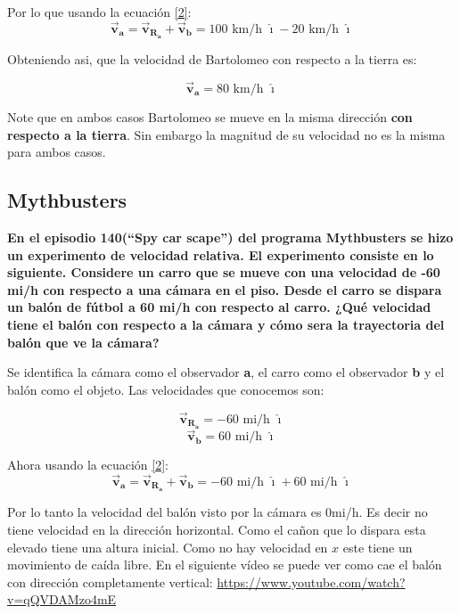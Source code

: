 \documentclass[a4paper,11pt]{article}
\begin{document}
	Por lo que usando la ecuación \ref{2}:
	\begin{equation}
	\vec{\textbf{v}}_{\textbf{a}} = \vec{\textbf{v}}_{\textbf{R}_\textbf{a}} + \vec{\textbf{v}}_{\textbf{b}} = 100 \text{ km/h }\boldsymbol{\hat{\imath}} - 20 \text{ km/h } \boldsymbol{\hat{\imath}}
	\end{equation}
	
	Obteniendo asi, que la velocidad de Bartolomeo con respecto a la tierra es:
	
	\begin{equation}
	\vec{\textbf{v}}_{\textbf{a}}= 80 \text{ km/h } \boldsymbol{\hat{\imath}}
	\end{equation}
	
	
	Note que en ambos casos Bartolomeo se mueve en la misma dirección \textbf{con respecto a la tierra}. Sin embargo la magnitud de su velocidad no es la misma para ambos casos.
		\color{pb}
	\subsection{Mythbusters}
	\textbf{En el episodio 140(``Spy car scape'') del programa Mythbusters se hizo un experimento de velocidad relativa. El experimento consiste en lo siguiente. Considere un carro que se mueve con una velocidad de -60 mi/h con respecto a una cámara en el piso. Desde el carro se dispara un balón de fútbol a 60 mi/h con respecto al carro. ¿Qué velocidad tiene el balón con respecto a la cámara y cómo sera la trayectoria del balón que ve la cámara?
		\\ }	\color{black}
	
	Se identifica la cámara como el observador \textbf{a}, el carro como el observador \textbf{b} y el balón como el objeto. Las velocidades que conocemos son:
	
	
	$$ \vec{\textbf{v}}_{\textbf{R}_\textbf{a}} = -60 \text{ mi/h } \boldsymbol{\hat{\imath}} $$
	$$ \vec{\textbf{v}}_{\textbf{b}} = 60 \text{ mi/h } \boldsymbol{\hat{\imath}}$$ 
	
	Ahora usando la ecuación \ref{2}:
	\begin{equation}
	\vec{\textbf{v}}_{\textbf{a}} = \vec{\textbf{v}}_{\textbf{R}_\textbf{a}} + \vec{\textbf{v}}_{\textbf{b}} = -60 \text{ mi/h }\boldsymbol{\hat{\imath}} + 60 \text{ mi/h } \boldsymbol{\hat{\imath}}
	\end{equation}
	
	Por lo tanto la velocidad del balón visto por la cámara es $0 $mi/h. Es decir no tiene velocidad en la dirección horizontal. Como el cañon que lo dispara esta elevado tiene una altura inicial. Como no hay velocidad en $x$ este tiene un movimiento de caída libre. En el siguiente vídeo se puede ver como cae el balón con dirección completamente vertical: \url{https://www.youtube.com/watch?v=qQVDAMzo4mE}
	
\end{document}
